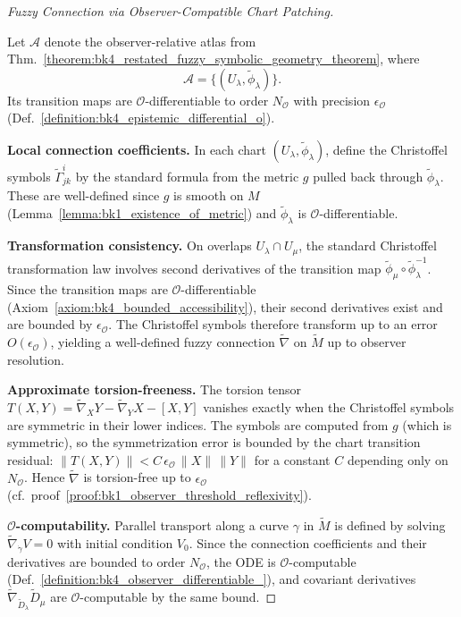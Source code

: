\begin{proof}[Fuzzy Connection via Observer-Compatible Chart Patching]
\label{proof:bk4_sketch_chart_connections}
\leavevmode

Let $\mathcal{A}$ denote the observer-relative atlas from
Thm.~\ref{theorem:bk4_restated_fuzzy_symbolic_geometry_theorem}, where
\[
\mathcal{A} = \{(U_\lambda, \tilde{\phi}_\lambda)\}.
\]
Its transition maps are $\mathcal{O}$-differentiable to order $N_\mathcal{O}$
with precision $\epsilon_\mathcal{O}$
(Def.~\ref{definition:bk4_epistemic_differential_o}).

\textbf{Local connection coefficients.}
In each chart $(U_\lambda, \tilde{\phi}_\lambda)$, define the Christoffel symbols
$\tilde{\Gamma}^i_{jk}$ by the standard formula from the metric $g$ pulled back
through $\tilde{\phi}_\lambda$. These are well-defined since $g$ is smooth on $M$
(Lemma~\ref{lemma:bk1_existence_of_metric}) and $\tilde{\phi}_\lambda$ is
$\mathcal{O}$-differentiable.

\textbf{Transformation consistency.}
On overlaps $U_\lambda \cap U_\mu$, the standard Christoffel transformation law involves
second derivatives of the transition map $\tilde{\phi}_\mu \circ \tilde{\phi}_\lambda^{-1}$.
Since the transition maps are $\mathcal{O}$-differentiable (Axiom~\ref{axiom:bk4_bounded_accessibility}),
their second derivatives exist and are bounded by $\epsilon_\mathcal{O}$. The Christoffel
symbols therefore transform up to an error $O(\epsilon_\mathcal{O})$, yielding a well-defined
fuzzy connection $\tilde{\nabla}$ on $\tilde{M}$ up to observer resolution.

\textbf{Approximate torsion-freeness.}
The torsion tensor $T(X,Y) = \tilde{\nabla}_X Y - \tilde{\nabla}_Y X - [X,Y]$ vanishes
exactly when the Christoffel symbols are symmetric in their lower indices. The symbols
are computed from $g$ (which is symmetric), so the symmetrization error is bounded by
the chart transition residual:
$\|T(X,Y)\| < C\,\epsilon_\mathcal{O}\,\|X\|\,\|Y\|$
for a constant $C$ depending only on $N_\mathcal{O}$. Hence $\tilde{\nabla}$ is torsion-free
up to $\epsilon_\mathcal{O}$ (cf.~proof~\ref{proof:bk1_observer_threshold_reflexivity}).

\textbf{$\mathcal{O}$-computability.}
Parallel transport along a curve $\gamma$ in $\tilde{M}$ is defined by solving
$\tilde{\nabla}_{\dot\gamma}V = 0$ with initial condition $V_0$. Since the connection
coefficients and their derivatives are bounded to order $N_\mathcal{O}$, the ODE is
$\mathcal{O}$-computable (Def.~\ref{definition:bk4_observer_differentiable_}), and
covariant derivatives $\tilde{\nabla}_{\tilde{D}_\lambda}\tilde{D}_\mu$ are
$\mathcal{O}$-computable by the same bound.
\end{proof}
